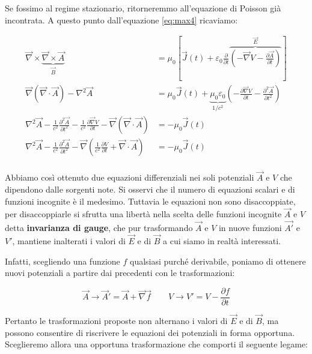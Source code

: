 Se fossimo al regime stazionario, ritorneremmo all'equazione di Poisson già incontrata. A questo punto dall'equazione \eqref{eq:max4} ricaviamo:

\begin{equation*}
	\begin{aligned}
		\vec{\nabla} \times \underbrace{\vec{\nabla} \times \vec{A}}_{\vec{B}}  &= \mu_0 \left[ \vec{J} (t) + \varepsilon_0 \frac{\partial}{\partial t} \overbrace{\left(-\vec{\nabla} V - \frac{\partial \vec{A}}{\partial t}\right)}^{\vec{E}}   \right] \\
		\vec{\nabla} (\vec{\nabla} \cdot \vec{A} ) - \nabla^2 \vec{A} &= \mu_0 \vec{J} (t) + \underbrace{\mu_0 \varepsilon_0}_{1/c^2} \left( -\frac{\partial \vec{\nabla} V}{\partial t} -\frac{\partial^2 \vec{A}}{\partial t^2}  \right)  \\
		\nabla^2 \vec{A} -\frac{1}{c^2}\frac{\partial^2 \vec{A}}{\partial t^2} -\frac{1}{c^2}\frac{\partial \vec{\nabla} V}{\partial t} - \vec{\nabla} (\vec{\nabla} \cdot \vec{A} ) &= -\mu_0 \vec{J} (t) \\
		\nabla^2 \vec{A} -\frac{1}{c^2}\frac{\partial^2 \vec{A}}{\partial t^2} - \vec{\nabla} \left(\frac{1}{c^2}\frac{\partial V}{\partial t} + \vec{\nabla} \cdot \vec{A} \right) &= -\mu_0 \vec{J} (t) \\
	\end{aligned}
\end{equation*}

Abbiamo così ottenuto due equazioni differenziali nei soli potenziali $\vec{A}$ e $V$ che dipendono dalle sorgenti note. Si osservi che il numero di equazioni scalari e di funzioni incognite è il medesimo. Tuttavia le equazioni non sono disaccoppiate, per disaccoppiarle si sfrutta una libertà nella scelta delle funzioni incognite $\vec{A}$ e $V$ detta \textbf{invarianza di gauge}, che pur trasformando $\vec{A}$ e $V$ in nuove funzioni $\vec{A'}$ e $V'$, mantiene inalterati i valori di $\vec{E}$ e di $\vec{B}$ a cui siamo in realtà interessati.

Infatti, scegliendo una funzione $f$ qualsiasi purché derivabile, poniamo di ottenere nuovi potenziali a partire dai precedenti con le trasformazioni:

\[
	\boxed{\vec{A} \to \vec{A}' = \vec{A} +\vec{\nabla} \vec{f} \qquad V\to V' = V-\frac{\partial f}{\partial t}}
\]

Pertanto le trasformazioni proposte non alternano i valori di $\vec{E}$ e di $ \vec{B}  $, ma possono consentire di riscrivere le equazioni dei potenziali in forma opportuna. Sceglieremo allora una opportuna trasformazione che comporti il seguente legame:

